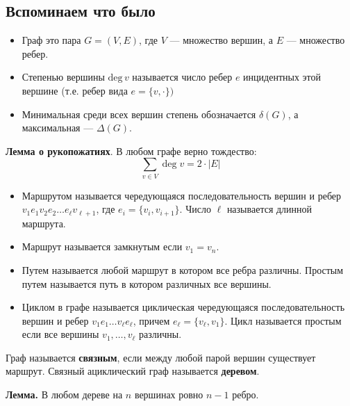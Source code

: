 \documentclass[a4paper,12pt,twoside]{article}
\begin{document}
\subsection*{Вспоминаем что было}
\begin{itemize}[noitemsep, parsep=0pt,topsep=0pt]
        \item Граф это пара $G = (V, E)$, где $V$ --- множество вершин, а $E$ --- множество ребер.
        \item Степенью вершины $\mathrm{deg}\,v$ называется число ребер $e$ инцидентных этой вершине (т.е. ребер вида $e = \{v, \cdot\})$
        \item Минимальная среди всех вершин степень обозначается $\delta(G)$, а максимальная --- $\Delta(G)$.
\end{itemize}

\noindent \textbf{Лемма о рукопожатиях}. В любом графе верно тождество:
$$
    \sum_{v \in V} \deg v = 2 \cdot |E|
$$

\begin{itemize}[noitemsep, parsep=0pt,topsep=0pt]
    \item Маршрутом называется чередующаяся последовательность вершин и ребер $v_1 e_1 v_2 e_2 \ldots e_{\ell} v_{\ell+1}$, где $e_i = \{v_i, v_{i+1}\}$. Число $\ell$ называется длинной маршрута.
    \item Маршрут называется замкнутым если $v_1 = v_n$.
    \item Путем называется любой маршрут в котором все  ребра различны. Простым путем называется путь в котором различных все вершины.
    \item Циклом в графе называется циклическая чередующаяся последовательность вершин и ребер $v_1 e_1 \ldots v_{\ell} e_{\ell}$, причем $e_\ell = \{v_\ell, v_1\}$. Цикл называется простым если все вершины $v_1, \ldots, v_\ell$ различны.  
\end{itemize}

Граф называется \textbf{связным}, если между любой парой вершин существует маршрут. Связный ациклический граф называется \textbf{деревом}.

\noindent \textbf{Лемма.} В любом дереве на $n$ вершинах ровно $n-1$ ребро.
\end{document}
